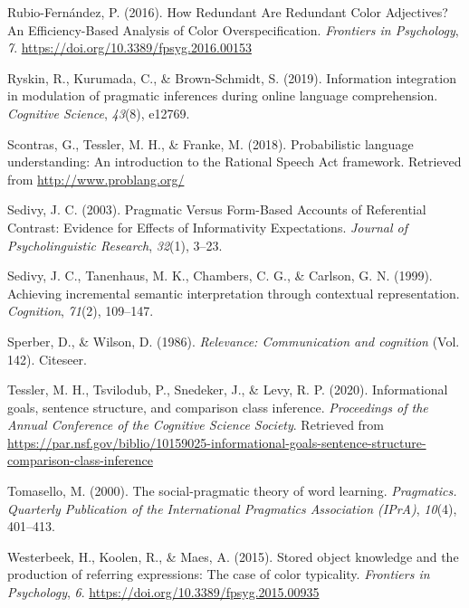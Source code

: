 \documentclass[
  english,
  man,floatsintext]{apa6}
\newlength{\cslhangindent}
\newenvironment{cslreferences}%
  {\setlength{\parindent}{0pt}%
  \everypar{\setlength{\hangindent}{\cslhangindent}}\ignorespaces}%
  {\par}
\begin{document}
\begin{cslreferences}
\leavevmode\hypertarget{ref-rubio-fernandez_how_2016}{}%
Rubio-Fernández, P. (2016). How Redundant Are Redundant Color Adjectives? An Efficiency-Based Analysis of Color Overspecification. \emph{Frontiers in Psychology}, \emph{7}. \url{https://doi.org/10.3389/fpsyg.2016.00153}

\leavevmode\hypertarget{ref-ryskin2019information}{}%
Ryskin, R., Kurumada, C., \& Brown-Schmidt, S. (2019). Information integration in modulation of pragmatic inferences during online language comprehension. \emph{Cognitive Science}, \emph{43}(8), e12769.

\leavevmode\hypertarget{ref-scontras_probabilistic_2018}{}%
Scontras, G., Tessler, M. H., \& Franke, M. (2018). Probabilistic language understanding: An introduction to the Rational Speech Act framework. Retrieved from \url{http://www.problang.org/}

\leavevmode\hypertarget{ref-sedivy_pragmatic_2003}{}%
Sedivy, J. C. (2003). Pragmatic Versus Form-Based Accounts of Referential Contrast: Evidence for Effects of Informativity Expectations. \emph{Journal of Psycholinguistic Research}, \emph{32}(1), 3--23.

\leavevmode\hypertarget{ref-sedivy_achieving_1999}{}%
Sedivy, J. C., Tanenhaus, M. K., Chambers, C. G., \& Carlson, G. N. (1999). Achieving incremental semantic interpretation through contextual representation. \emph{Cognition}, \emph{71}(2), 109--147.

\leavevmode\hypertarget{ref-sperber1986relevance}{}%
Sperber, D., \& Wilson, D. (1986). \emph{Relevance: Communication and cognition} (Vol. 142). Citeseer.

\leavevmode\hypertarget{ref-tessler_informational_2020}{}%
Tessler, M. H., Tsvilodub, P., Snedeker, J., \& Levy, R. P. (2020). Informational goals, sentence structure, and comparison class inference. \emph{Proceedings of the Annual Conference of the Cognitive Science Society}. Retrieved from \url{https://par.nsf.gov/biblio/10159025-informational-goals-sentence-structure-comparison-class-inference}

\leavevmode\hypertarget{ref-tomasello2000social}{}%
Tomasello, M. (2000). The social-pragmatic theory of word learning. \emph{Pragmatics. Quarterly Publication of the International Pragmatics Association (IPrA)}, \emph{10}(4), 401--413.

\leavevmode\hypertarget{ref-westerbeek_2015}{}%
Westerbeek, H., Koolen, R., \& Maes, A. (2015). Stored object knowledge and the production of referring expressions: The case of color typicality. \emph{Frontiers in Psychology}, \emph{6}. \url{https://doi.org/10.3389/fpsyg.2015.00935}


\end{cslreferences}
\end{document}
